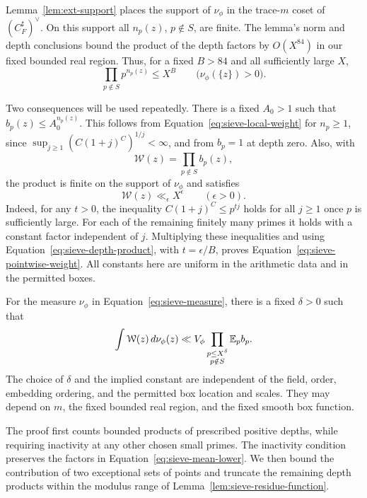 Lemma~\ref{lem:ext-support} places the support of $\nu_\phi$ in the
trace-$m$ coset of $(C_F^\sharp)^\vee$.  On this support all $n_p(z)$,
$p\notin S$, are finite.  The lemma's norm and depth conclusions bound
the product of the depth factors by $O(X^{84})$ in our fixed bounded real region.  Thus,
for a fixed $B>84$ and all sufficiently large $X$,
\begin{equation}\label{eq:sieve-depth-product}
 \prod_{p\notin S}p^{n_p(z)}\le X^B
 \qquad\bigl(\nu_\phi(\{z\})>0\bigr).
\end{equation}

Two consequences will be used repeatedly.  There is a fixed $A_0>1$ such
that $b_p(z)\le A_0^{n_p(z)}$.  This follows from
Equation~\eqref{eq:sieve-local-weight} for $n_p\ge1$, since
$\sup_{j\ge1}(C(1+j)^C)^{1/j}<\infty$, and from $b_p=1$ at depth zero.
Also, with
\[
 \mathcal W(z)=\prod_{p\notin S}b_p(z),
\]
the product is finite on the support of $\nu_\phi$ and satisfies
\begin{equation}\label{eq:sieve-pointwise-weight}
 \mathcal W(z)\ll_\epsilon X^\epsilon
 \qquad(\epsilon>0).
\end{equation}
Indeed, for any $t>0$, the inequality
$C(1+j)^C\le p^{tj}$ holds for all $j\ge1$ once $p$ is sufficiently large.
For each of the remaining finitely many primes it holds with a constant
factor independent of $j$.  Multiplying these inequalities and using
Equation~\eqref{eq:sieve-depth-product}, with $t=\epsilon/B$, proves
Equation~\eqref{eq:sieve-pointwise-weight}.  All constants here are uniform
in the arithmetic data and in the permitted boxes.

\begin{proposition}\label{prop:sieve-averaging}
For the measure $\nu_\phi$ in Equation~\eqref{eq:sieve-measure}, there is
a fixed $\delta>0$ such that
\begin{equation}\label{eq:sieve-average}
 \int\mathcal W(z)\,d\nu_\phi(z)
   \ll V_\phi\prod_{\substack{p\le X^\delta\\p\notin S}}\mathbb E_p b_p.
\end{equation}
The choice of $\delta$ and the implied constant are independent of the
field, order, embedding ordering, and the permitted box location and
scales.  They may depend on $m$, the fixed bounded real region, and the
fixed smooth box function.
\end{proposition}

The proof first counts bounded products of prescribed positive depths,
while requiring inactivity at any other chosen small primes.  The
inactivity condition preserves the factors in
Equation~\eqref{eq:sieve-mean-lower}.  We then bound the contribution of two
exceptional sets of points and truncate the remaining depth products within
the modulus range of
Lemma~\ref{lem:sieve-residue-function}.

